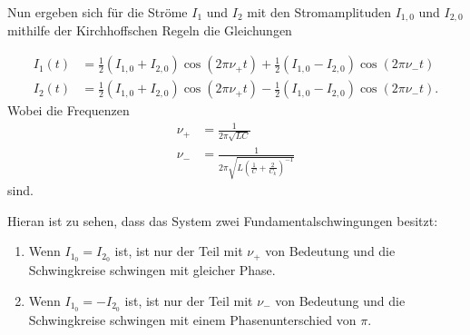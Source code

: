 Nun ergeben sich für die Ströme $I_1$ und $I_2$ mit den Stromamplituden $I_{1,0}$ und $I_{2,0}$ mithilfe der Kirchhoffschen Regeln die Gleichungen

\begin{align}
    \label{eq:strom}
    I_1(t) &= \frac{1}{2} (I_{1,0} + I_{2,0})\cos(2 \pi \nu _+ t) + \frac{1}{2} (I_{1,0} - I_{2,0})\cos(2 \pi \nu _- t) \\
    I_2(t) &= \frac{1}{2} (I_{1,0} + I_{2,0})\cos(2 \pi \nu _+ t) - \frac{1}{2} (I_{1,0} - I_{2,0})\cos(2 \pi \nu _- t).
\end{align}
Wobei die Frequenzen
\begin{align}
    \label{eq:frequenz+}
    \nu _+ &= \frac{1}{2 \pi \sqrt{L C}} \\
    \label{eq:frequenz-}
    \nu _- &= \frac{1}{2 \pi \sqrt{L \left( \frac{1}{C} + \frac{2}{C_k} \right)^{-1}}}
\end{align}
sind.\cite{V355}

Hieran ist zu sehen, dass das System zwei Fundamentalschwingungen besitzt:
\begin{enumerate}
\item Wenn $I_{1_0} = I_{2_0}$ ist, ist nur der Teil mit $\nu _+$ von Bedeutung und die Schwingkreise schwingen mit gleicher Phase.
\item Wenn $I_{1_0} = - I_{2_0}$ ist, ist nur der Teil mit $\nu _-$ von Bedeutung und die Schwingkreise schwingen mit einem Phasenunterschied von $\pi$.
\end{enumerate}

